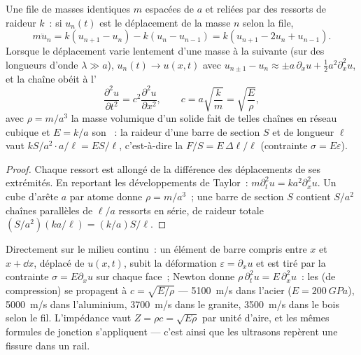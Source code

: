 \begin{proposition}\label{prop:b2:waves-on-strings:chain}
Une file de masses identiques $m$ espacées de $a$ et reliées par des ressorts de
raideur $k$~: si $u_n(t)$ est le déplacement de la masse $n$ selon la
file,
\[
m\ddot u_n = k(u_{n+1} - u_n) - k(u_n - u_{n-1}) = k(u_{n+1} - 2u_n + u_{n-1}) .
\]
Lorsque le déplacement varie lentement d'une masse à la suivante (sur des
longueurs d'onde $\lambda \gg a$), $u_n(t) \to u(x, t)$ avec $u_{n\pm1} - u_n \approx
\pm a\,\partial_xu + \tfrac12a^2\partial_x^2u$, et la chaîne obéit à l'
\[
\frac{\partial^2u}{\partial t^2} = c^2\frac{\partial^2u}{\partial x^2} , \qquad
c = a\sqrt{\frac km} = \sqrt{\frac{E}{\rho}} ,
\]
avec $\rho = m/a^3$ la masse volumique d'un solide fait de telles chaînes en
réseau cubique et $E = k/a$ son \emph{}~: la raideur d'une
barre de section $S$ et de longueur $\ell$ vaut $kS/a^2\cdot a/\ell = ES/\ell$,
c'est-à-dire la \emph{} $F/S = E\,\Delta\ell/\ell$ (contrainte $\sigma = E\varepsilon$).
\end{proposition}

\begin{proof}
Chaque ressort est allongé de la différence des déplacements de ses
extrémités. En reportant les développements de Taylor~: $m\partial_t^2u = ka^2\partial_x^2u$. Un cube
d'arête $a$ par atome donne $\rho = m/a^3$~; une barre de section $S$ contient
$S/a^2$ chaînes parallèles de $\ell/a$ ressorts en série, de raideur totale
$(S/a^2)(ka/\ell) = (k/a)S/\ell$.
\end{proof}

\begin{proposition}\label{prop:b2:waves-on-strings:rod}
Directement sur le milieu continu~: un élément de barre compris entre $x$ et $x +
\dd x$, déplacé de $u(x, t)$, subit la déformation $\varepsilon = \partial_xu$ et est tiré
par la contrainte $\sigma = E\partial_xu$ sur chaque face~; Newton donne $\rho\,\partial_t^2u =
E\,\partial_x^2u$~: les  (de compression) se propagent à $c = \sqrt{E/\rho}$
--- \qty{5100}{m/s} dans l'acier ($E = \qty{200}{GPa}$), \qty{5000}{m/s} dans l'aluminium,
\qty{3700}{m/s} dans le granite, \qty{3500}{m/s} dans le bois selon le fil. L'impédance
vaut $Z = \rho c = \sqrt{E\rho}$ par unité d'aire, et les mêmes formules de
jonction s'appliquent --- c'est ainsi que les ultrasons repèrent une fissure dans un
rail.
\end{proposition}

